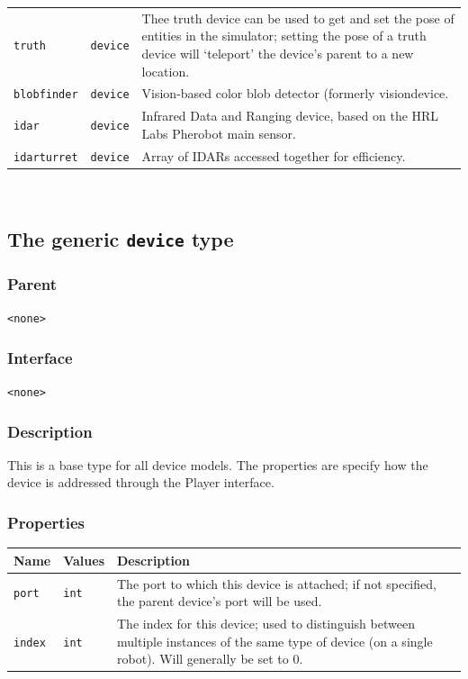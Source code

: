 \documentclass[11pt,twoside]{report}
\begin{document}
\begin{tabularx}{\columnwidth}{llX}
\verb'truth' & \verb'device' & Thee truth device can be used to get
and set the pose of entities in the simulator; setting the pose of a
truth device will `teleport' the device's parent to a new location.\\

\verb'blobfinder' & \verb'device' & Vision-based color blob detector
(formerly visiondevice.\\

\verb'idar' & \verb'device' & Infrared Data and Ranging device, based
on the HRL Labs Pherobot main sensor.\\

\verb'idarturret' & \verb'device' & Array of IDARs accessed together
for efficiency.\\

\hline
\end{tabularx}
\vspace{1em}\\

\newpage
\subsection{The generic {\tt device} type}

\subsubsection*{Parent}
{\tt <none>}

\subsubsection*{Interface}
{\tt <none>}


\subsubsection*{Description}
This is a base type for all device models. The properties are specify
how the device is addressed through the Player interface.

\subsubsection*{Properties}
\begin{tabularx}{\columnwidth}{llX}
\hline
Name & Values & Description \\
\hline

\verb'port' & \verb'int' & The port to which this device is attached;
if not specified, the parent device's port will be used.\\

\verb'index' & \verb'int' & The index for this device; used to
distinguish between multiple instances of the same type of device (on
a single robot).  Will generally be set to 0.\\

\hline
\end{tabularx}
\end{document}
